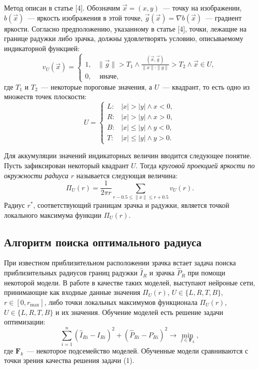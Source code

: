 \documentclass[12pt, twoside]{article}
\begin{document}
Метод описан в статье [4]. Обозначим $\vec{x} = (x, y)$~--- точку на изображении, $b(\vec{x})$~--- яркость изображения в этой точке, $\vec{g}(\vec{x}) = \nabla b(\vec{x})$~--- градиент яркости. Согласно предположению, указанному в статье [4], точки, лежащие на границе радужки либо зрачка, должны удовлетворять условию, описываемому индикаторной функцией:
\[
v_U(\vec{x}) = \begin{cases}1, & \parallel \vec{g} \parallel > T_1 \land \frac{(\vec{x}, \vec{g})}{\parallel x \parallel \cdot \parallel g \parallel} > T_2 \land \vec{x} \in U, \\ 0, & \text{ иначе,}\end{cases}
\]
где $T_1$ и $T_2$~--- некоторые пороговые значения, а $U$~--- квадрант, то есть одно из множеств точек плоскости:
\[
U = \begin{cases}L\!: & |x| > |y| \land x < 0, \\ R\!: & |x| > |y| \land x > 0, \\ B\!: & |x| \leqslant |y| \land y < 0, \\ T\!: & |x| \leqslant |y| \land y > 0.\end{cases}
\]

Для аккумуляции значений индикаторных величин вводится следующее понятие. Пусть зафиксирован некоторый квадрант $U$. Тогда \textit{круговой проекцией яркости по окружности радиуса $r$} называется следующая величина:
\[
\Pi_U(r) = \frac{1}{2\pi r} \sum_{r-0.5 \leqslant \parallel x \parallel \leqslant r + 0.5} v_U(r).
\]
Радиус $r^*$, соответствующий границам зрачка и радужки, является точкой локального максимума функции $\Pi_U(r)$.

\subsection{Алгоритм поиска оптимального радиуса}

При известном приблизительном расположении зрачка встает задача поиска приблизительных радиусов границ радужки $\widehat{I}_R$ и зрачка $\widehat{P}_R$ при помощи некоторой модели. В работе в качестве таких моделей, выступают нейроные сети, принимающие как входные данные значения $\Pi_U(r)$, $U \in \{L, R, T, B\}$,  $r \in [0, r_{\max }] $, либо точки локальных максимумов функционала $\Pi_U(r)$, $U \in \{L, R, T, B\}$ и их значения. Обучение моделей есть решение задачи оптимизации:
\begin{equation}
\sum_{i=1}^n \left(\widehat{I}_{Ri} - I_{Ri}\right)^2 + \left(\widehat{P}_{Ri} - P_{Ri}\right)^2 \to \min_{f \in \mathbf{F}_k},
\end{equation}
где $\mathbf{F}_k$~--- некоторое подсемейство моделей. Обученные модели сравниваются с точки зрения качества решения задачи (1).
\end{document}
